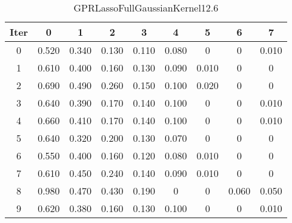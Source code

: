 \begin{table}
	\begin{center}
		\begin{tabular}{|c|c|c|c|c|c|c|c|c|}
			\hline
			Iter & 0 & 1 & 2 & 3 & 4 & 5 & 6 & 7 \\
			\hline
			0 & 0.520 & 0.340 & 0.130 & 0.110 & 0.080 & 0 & 0 & 0.010 \\
			\hline
			1 & 0.610 & 0.400 & 0.160 & 0.130 & 0.090 & 0.010 & 0 & 0 \\
			\hline
			2 & 0.690 & 0.490 & 0.260 & 0.150 & 0.100 & 0.020 & 0 & 0 \\
			\hline
			3 & 0.640 & 0.390 & 0.170 & 0.140 & 0.100 & 0 & 0 & 0.010 \\
			\hline
			4 & 0.660 & 0.410 & 0.170 & 0.140 & 0.100 & 0 & 0 & 0.010 \\
			\hline
			5 & 0.640 & 0.320 & 0.200 & 0.130 & 0.070 & 0 & 0 & 0 \\
			\hline
			6 & 0.550 & 0.400 & 0.160 & 0.120 & 0.080 & 0.010 & 0 & 0 \\
			\hline
			7 & 0.610 & 0.450 & 0.240 & 0.140 & 0.090 & 0.010 & 0 & 0 \\
			\hline
			8 & 0.980 & 0.470 & 0.430 & 0.190 & 0 & 0 & 0.060 & 0.050 \\
			\hline
			9 & 0.620 & 0.380 & 0.160 & 0.130 & 0.100 & 0 & 0 & 0.010 \\
			\hline
		\end{tabular}
	\end{center}
	\caption{GPRLassoFullGaussianKernel12.6}
\end{table}